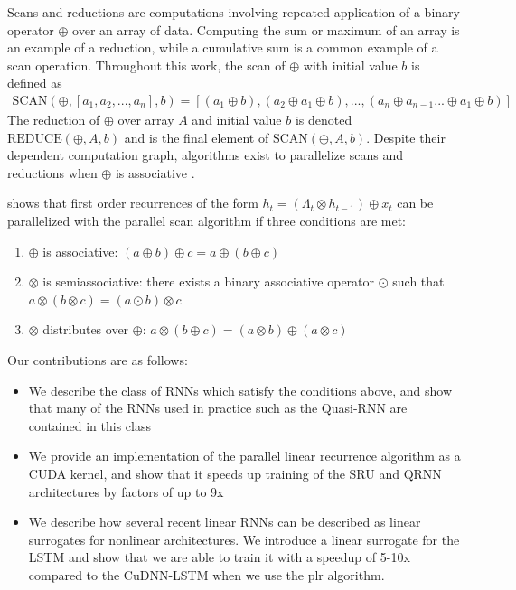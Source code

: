 \documentclass{article}
\providecommand{\scan}{\text{SCAN}}
\providecommand{\reduce}{\text{REDUCE}}
\begin{document}
Scans and reductions are computations involving repeated application of a binary
operator $\oplus$ over an array of data. Computing the sum or maximum
of an array is an example of a reduction, while a cumulative sum is a common
example of a scan operation. Throughout this work, the scan of $\oplus$ with
initial value $b$ is defined as
\begin{align*}
\scan(\oplus, [a_1, a_2, ..., a_n], b) = [(a_1 \oplus b), (a_2 \oplus a_1 \oplus b), ..., (a_n \oplus a_{n-1} ... \oplus a_1 \oplus b)]
\end{align*}
The reduction of $\oplus$ over array $A$ and initial value $b$ is denoted 
$\reduce(\oplus, A, b)$ and is the final element of $\scan(\oplus, A, b)$.
Despite their dependent computation graph, algorithms exist to parallelize scans 
and reductions when $\oplus$ is associative \cite{ladner1980parallel}.

\citet{blelloch1990prefix} shows that first order recurrences of the form
$h_t = (\Lambda_t \otimes h_{t-1}) \oplus x_t$ can be parallelized with
the parallel scan algorithm if three conditions are met:

\begin{enumerate}
\item $\oplus$ is associative: $(a \oplus b) \oplus c = a \oplus (b \oplus c)$
\item $\otimes$ is semiassociative: there exists a binary associative operator
$\odot$ such that $a \otimes (b \otimes c) = (a \odot b) \otimes c$
\item $\otimes$ distributes over $\oplus$: $a\otimes(b\oplus c) = (a\otimes b) \oplus (a \otimes c)$ 
\end{enumerate}

Our contributions are as follows:
\begin{itemize}
\item{We describe the class of RNNs which satisfy the conditions above, and
    show that many of the RNNs used in practice such as the Quasi-RNN are
    contained in this class}
\item{We provide an implementation of the parallel linear recurrence
    algorithm as a CUDA kernel, and show that it speeds up training of
    the SRU and QRNN architectures by factors of up to 9x}
\item{We describe how several recent linear RNNs can be described as
    linear surrogates for nonlinear architectures. We introduce a linear
    surrogate for the LSTM and show that we are able to train it
    with a speedup of 5-10x compared to the CuDNN-LSTM when we use the plr
    algorithm.}
\end{itemize}
\end{document}
